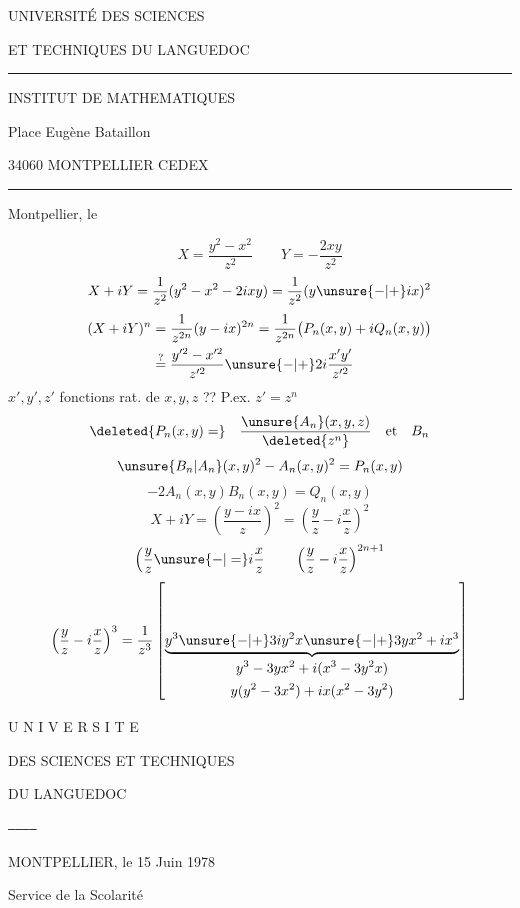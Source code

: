 
UNIVERSITÉ DES SCIENCES

ET TECHNIQUES DU LANGUEDOC

\rule{1cm}{.4pt}

INSTITUT DE MATHEMATIQUES

Place Eugène Bataillon

34060 MONTPELLIER CEDEX

\rule{1cm}{.4pt}

Montpellier, le

\[
X=\frac{y^2-x^2}{z^2}\qquad Y=-\frac{2xy}{z^2}
\]
\[
X+iY=\frac1{z^2}(y^2-x^2-2ixy)=\frac1{z^2}(y\unsure{-|+}ix)^2
\]
\[
\begin{aligned}
(X+iY)^n&=\frac1{z^{2n}}(y-ix)^{2n}
=\frac1{z^{2n}}\bigl(P_n(x,y)+iQ_n(x,y)\bigr)\\
&\overset{?}{=}\frac{y'^2-x'^2}{z'^2}\unsure{-|+}2i\frac{x'y'}{z'^2}
\end{aligned}
\]
$x',y',z'$ fonctions rat. de $x,y,z$ ?? P.ex. $z'=z^n$
\[
\deleted{P_n(x,y)=}\quad\frac{\unsure{A_n}(x,y,z)}{\deleted{z^n}}\quad\text{et}\quad B_n
\]
\[
\unsure{B_n|A_n}(x,y)^2-A_n(x,y)^2=P_n(x,y)
\]
\[
-2A_n(x,y)B_n(x,y)=Q_n(x,y)
\]
\[
X+iY=\left(\frac{y-ix}{z}\right)^2=\left(\frac yz-i\frac xz\right)^2
\]
\[
\left(\frac yz\unsure{-|=}i\frac xz\right.\qquad
\left(\frac yz-i\frac xz\right)^{2n+1}
\]
\[
\left(\frac yz-i\frac xz\right)^3
=\frac1{z^3}\left[
\underbrace{y^3\unsure{-|+}3iy^2x\unsure{-|+}3yx^2+ix^3}_{
\begin{gathered}
y^3-3yx^2+i(x^3-3y^2x)\\
y(y^2-3x^2)+ix(x^2-3y^2)
\end{gathered}}
\right]
\]

U N I V E R S I T E

DES SCIENCES ET TECHNIQUES

DU LANGUEDOC

\texttt{------------}

MONTPELLIER, le 15 Juin 1978

Service de la Scolarité

